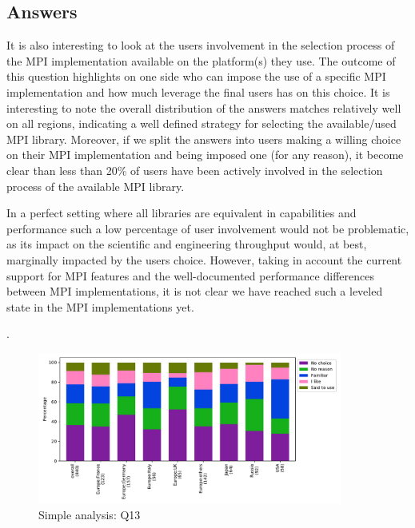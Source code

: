 
\subsection{Answers}


It is also interesting to look at the users involvement in the selection process
of the MPI implementation available on the platform(s) they use. The outcome of
this question highlights on one side who can impose the use of a specific MPI
implementation and how much leverage the final users has on this choice. It is
interesting to note the overall distribution of the answers matches
relatively well on all regions, indicating a well defined strategy for selecting
the available/used MPI library. Moreover, if we split the answers into users
making a willing choice on their MPI implementation and being imposed one (for
any reason), it become clear than less than 20\% of users have been actively
involved in the selection process of the available MPI library.


In a perfect setting where all libraries are equivalent in capabilities and
performance such a low percentage of user involvement would not be problematic,
as its impact on the scientific and engineering throughput would, at best,
marginally impacted by the users choice. However, taking in account the current
support for MPI features and the well-documented performance differences between
MPI implementations, it is not clear we have reached such a leveled state in the
MPI implementations yet.

.

\begin{figure}[htb]
\begin{center}
\includegraphics[width=10cm]{../pdfs/Q13.pdf}
\caption{Simple analysis: Q13}
\label{fig:Q13}
\end{center}
\end{figure}


